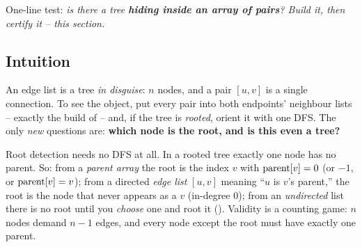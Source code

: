 \begin{recognitionbox}
One-line test: \emph{is there a tree \textbf{hiding inside an array of pairs}? Build it, then
certify it -- this section.}
\end{recognitionbox}

\subsection{Intuition}

An edge list is a tree \emph{in disguise}: $n$ nodes, and a pair $[u,v]$ is a single connection.
To see the object, put every pair into both endpoints' neighbour lists -- exactly the 
build of  -- and, if the tree is \emph{rooted}, orient it with one DFS. The
only \emph{new} questions are: \textbf{which node is the root, and is this even a tree?}

Root detection needs no DFS at all. In a rooted tree exactly one node has no parent. So: from a
\emph{parent array} the root is the index $v$ with $\operatorname{parent}[v]=0$ (or $-1$, or $\operatorname{parent}[v]=v$);
from a directed \emph{edge list} $[u,v]$ meaning ``$u$ is $v$'s parent,'' the root is the node that
never appears as a $v$ (in-degree $0$); from an \emph{undirected} list there is no root until you
\emph{choose} one and root it (). Validity is a counting game: $n$ nodes demand
$n-1$ edges, and every node except the root must have exactly one parent.

